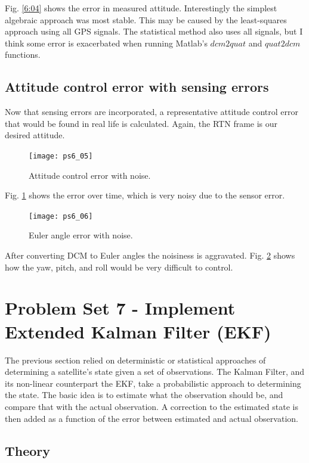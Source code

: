 \documentclass[12pt, letterpaper]{article}
\begin{document}
Fig. \ref{6:04} shows the error in measured attitude. Interestingly the simplest algebraic approach was most stable. This may be caused by the least-squares approach using all GPS signals. The statistical method also uses all signals, but I think some error is exacerbated when running Matlab's $dcm2quat$ and $quat2dcm$ functions.


\subsection{Attitude control error with sensing errors}

Now that sensing errors are incorporated, a representative attitude control error that would be found in real life is calculated. Again, the RTN frame is our desired attitude.

\begin{figure}[H]
	\centering
	\texttt{[image: ps6\_05]}
	\caption{Attitude control error with noise.}
	\label{6:05}
\end{figure}

Fig. \ref{6:05} shows the error over time, which is very noisy due to the sensor error.

\begin{figure}[H]
	\centering
	\texttt{[image: ps6\_06]}
	\caption{Euler angle error with noise.}
	\label{6:06}
\end{figure}

After converting DCM to Euler angles the noisiness is aggravated. Fig. \ref{6:06} shows how the yaw, pitch, and roll would be very difficult to control.



\section{Problem Set 7 - Implement Extended Kalman Filter (EKF)}

The previous section relied on deterministic or statistical approaches of determining a satellite's state given a set of observations. The Kalman Filter, and its non-linear counterpart the EKF, take a probabilistic approach to determining the state. The basic idea is to estimate what the observation should be, and compare that with the actual observation. A correction to the estimated state is then added as a function of the error between estimated and actual observation.

\subsection{Theory}
\end{document}
